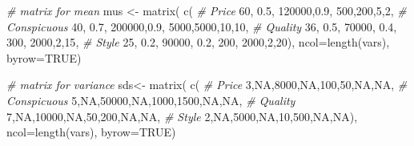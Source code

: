 \documentclass[
  12pt,
]{krantz}
\makeatletter
\newenvironment{Shaded}{\begin{snugshade}}{\end{snugshade}}
\newcommand{\AttributeTok}[1]{\textcolor[rgb]{0.61,0.61,0.61}{#1}}
\newcommand{\CommentTok}[1]{\textcolor[rgb]{0.37,0.37,0.37}{\textit{#1}}}
\newcommand{\ConstantTok}[1]{\textcolor[rgb]{0,0,0}{#1}}
\newcommand{\DecValTok}[1]{\textcolor[rgb]{0.06,0.06,0.06}{#1}}
\newcommand{\FloatTok}[1]{\textcolor[rgb]{0.06,0.06,0.06}{#1}}
\newcommand{\FunctionTok}[1]{\textcolor[rgb]{0,0,0}{#1}}
\newcommand{\NormalTok}[1]{#1}
\newcommand{\OtherTok}[1]{\textcolor[rgb]{0.37,0.37,0.37}{#1}}
\newenvironment{kframe}{%
\medskip{}
\setlength{\fboxsep}{.8em}
 \def\at@end@of@kframe{}%
 \ifinner\ifhmode%
  \def\at@end@of@kframe{\end{minipage}}%
  \begin{minipage}{\columnwidth}%
 \fi\fi%
 \def\FrameCommand##1{\hskip\@totalleftmargin \hskip-\fboxsep
 \colorbox{shadecolor}{##1}\hskip-\fboxsep
     \hskip-\linewidth \hskip-\@totalleftmargin \hskip\columnwidth}%
 \MakeFramed {\advance\hsize-\width
   \@totalleftmargin\z@ \linewidth\hsize
   \@setminipage}}%
 {\par\unskip\endMakeFramed%
 \at@end@of@kframe}
\renewenvironment{Shaded}{\begin{kframe}}{\end{kframe}}
\makeatother
\begin{document}
\begin{Shaded}
\begin{Highlighting}[]
\CommentTok{\# matrix for mean}
\NormalTok{mus }\OtherTok{\textless{}{-}} \FunctionTok{matrix}\NormalTok{( }\FunctionTok{c}\NormalTok{(}
  \CommentTok{\# Price}
  \DecValTok{60}\NormalTok{, }\FloatTok{0.5}\NormalTok{, }\DecValTok{120000}\NormalTok{,}\FloatTok{0.9}\NormalTok{, }\DecValTok{500}\NormalTok{,}\DecValTok{200}\NormalTok{,}\DecValTok{5}\NormalTok{,}\DecValTok{2}\NormalTok{,}
  \CommentTok{\# Conspicuous}
  \DecValTok{40}\NormalTok{, }\FloatTok{0.7}\NormalTok{, }\DecValTok{200000}\NormalTok{,}\FloatTok{0.9}\NormalTok{, }\DecValTok{5000}\NormalTok{,}\DecValTok{5000}\NormalTok{,}\DecValTok{10}\NormalTok{,}\DecValTok{10}\NormalTok{,}
  \CommentTok{\# Quality}
  \DecValTok{36}\NormalTok{, }\FloatTok{0.5}\NormalTok{, }\DecValTok{70000}\NormalTok{, }\FloatTok{0.4}\NormalTok{, }\DecValTok{300}\NormalTok{, }\DecValTok{2000}\NormalTok{,}\DecValTok{2}\NormalTok{,}\DecValTok{15}\NormalTok{,}
  \CommentTok{\# Style}
  \DecValTok{25}\NormalTok{, }\FloatTok{0.2}\NormalTok{, }\DecValTok{90000}\NormalTok{, }\FloatTok{0.2}\NormalTok{, }\DecValTok{200}\NormalTok{, }\DecValTok{2000}\NormalTok{,}\DecValTok{2}\NormalTok{,}\DecValTok{20}\NormalTok{), }
  \AttributeTok{ncol=}\FunctionTok{length}\NormalTok{(vars), }\AttributeTok{byrow=}\ConstantTok{TRUE}\NormalTok{)}
\end{Highlighting}
\end{Shaded}

\begin{Shaded}
\begin{Highlighting}[]
\CommentTok{\# matrix for variance}
\NormalTok{sds}\OtherTok{\textless{}{-}} \FunctionTok{matrix}\NormalTok{( }\FunctionTok{c}\NormalTok{(}
  \CommentTok{\# Price}
  \DecValTok{3}\NormalTok{,}\ConstantTok{NA}\NormalTok{,}\DecValTok{8000}\NormalTok{,}\ConstantTok{NA}\NormalTok{,}\DecValTok{100}\NormalTok{,}\DecValTok{50}\NormalTok{,}\ConstantTok{NA}\NormalTok{,}\ConstantTok{NA}\NormalTok{,}
  \CommentTok{\# Conspicuous}
  \DecValTok{5}\NormalTok{,}\ConstantTok{NA}\NormalTok{,}\DecValTok{50000}\NormalTok{,}\ConstantTok{NA}\NormalTok{,}\DecValTok{1000}\NormalTok{,}\DecValTok{1500}\NormalTok{,}\ConstantTok{NA}\NormalTok{,}\ConstantTok{NA}\NormalTok{,}
  \CommentTok{\# Quality}
  \DecValTok{7}\NormalTok{,}\ConstantTok{NA}\NormalTok{,}\DecValTok{10000}\NormalTok{,}\ConstantTok{NA}\NormalTok{,}\DecValTok{50}\NormalTok{,}\DecValTok{200}\NormalTok{,}\ConstantTok{NA}\NormalTok{,}\ConstantTok{NA}\NormalTok{,}
  \CommentTok{\# Style}
  \DecValTok{2}\NormalTok{,}\ConstantTok{NA}\NormalTok{,}\DecValTok{5000}\NormalTok{,}\ConstantTok{NA}\NormalTok{,}\DecValTok{10}\NormalTok{,}\DecValTok{500}\NormalTok{,}\ConstantTok{NA}\NormalTok{,}\ConstantTok{NA}\NormalTok{), }
  \AttributeTok{ncol=}\FunctionTok{length}\NormalTok{(vars), }\AttributeTok{byrow=}\ConstantTok{TRUE}\NormalTok{)}
\end{Highlighting}
\end{Shaded}
\end{document}
